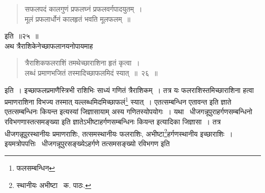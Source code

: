 \documentclass[11pt, openany]{book}
\begin{document}
\begin{quote}
{\qt सफलपदं कालगुणं प्रफलघ्नं प्रफलवर्गपादयुतम्~।\\
मूलं प्रफलार्धोनं कालहृतं भवति मूलफलम्~॥}
\end{quote}

\noindent इति~॥२५~॥\\

अथ त्रैराशिकेनेच्छाफलानयनोपायमाह\textendash

\begin{quote}
{\ab त्रैराशिकफलराशिं तमथेच्छाराशिना हृतं कृत्वा~।\\
लब्धं प्रमाणभजितं तस्मादिच्छाफलमिदं स्यात्~॥~२६~॥}
\end{quote}

इति~। इच्छाफलप्रमाणैस्त्रिभी राशिभिः साध्यं गणितं त्रैराशिकम्~। तत्र यः फलराशिस्तमिच्छाराशिना हत्वा प्रमाणराशिना विभज्य तस्मात् यल्लब्धमिदमिच्छाफलं\renewcommand{\thefootnote}{४}\footnote{फलसम्बन्धिन} स्यात्~। एतत्सम्बन्धिन एतावन्त इति ज्ञाते एतत्सम्बन्धिनः कियन्त इत्यस्यां जिज्ञासायाम् अस्य गणितस्योपयोगः~। यथा \textendash\ धीजगन्नूपुराहर्गणसम्बन्धिनो रविभगणास्तत्समङ्ख्या इति ज्ञातेऽभीष्टाहर्गणसम्बन्धिनः कियन्त इत्यादिका जिज्ञासा~। तत्र धीजगन्नूपुरस्थानीयः प्रमाणराशिः, तत्समस्थानीयः फलराशिः, अभीष्टा\renewcommand{\thefootnote}{५}\footnote{स्थानीयः अभीष्टा \textendash\ क. पाठः.}हर्गणस्थानीय इच्छाराशिः~। इयमत्रोपपत्तिः \textendash\ धीजगन्नूपुरसङ्ख्येऽहर्गणे तत्समसङ्ख्यो रविभगण इति

\newpage
\end{document}
